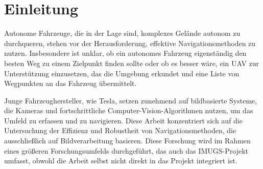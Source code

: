 \section{Einleitung}
Autonome Fahrzeuge, die in der Lage sind, komplexes Gelände autonom zu durchqueren, stehen vor der Herausforderung, 
effektive Navigationsmethoden zu nutzen. 
Insbesondere ist unklar, ob ein autonomes Fahrzeug eigenständig den besten Weg zu einem Zielpunkt finden 
sollte oder ob es besser wäre, ein \ac{UAV} zur Unterstützung einzusetzen, 
das die Umgebung erkundet und eine Liste von Wegpunkten an das Fahrzeug übermittelt.

Junge Fahrzeughersteller, wie Tesla, setzen zunehmend auf bildbasierte Systeme, 
die Kameras und fortschrittliche Computer-Vision-Algorithmen nutzen, um das Umfeld zu erfassen und zu navigieren.
Diese Arbeit konzentriert sich auf die Untersuchung der Effizienz und Robustheit von Navigationsmethoden, 
die ausschließlich auf Bildverarbeitung basieren. 
Diese Forschung wird im Rahmen eines größeren Forschungsumfelds durchgeführt, 
das auch das \ac{IMUGS}-Projekt umfasst, obwohl die Arbeit selbst nicht direkt in das Projekt integriert ist.